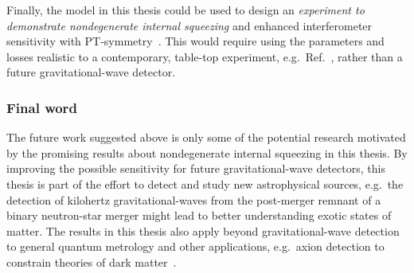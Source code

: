 
Finally, the model in this thesis could be used to design an \emph{experiment to demonstrate nondegenerate internal squeezing} and enhanced interferometer sensitivity with PT-symmetry~\cite{}. This would require using the parameters and losses realistic to a contemporary, table-top experiment, e.g.\ Ref.~\cite{}, rather than a future gravitational-wave detector.


\subsubsection{Final word}
The future work suggested above is only some of the potential research motivated by the promising results about nondegenerate internal squeezing in this thesis.
By improving the possible sensitivity for future gravitational-wave detectors, this thesis is part of the effort to detect and study new astrophysical sources, e.g.\ the detection of kilohertz gravitational-waves from the post-merger remnant of a binary neutron-star merger might lead to better understanding exotic states of matter.
The results in this thesis also apply beyond gravitational-wave detection to general quantum metrology and other applications, e.g.\ axion detection to constrain theories of dark matter~\cite{}.


